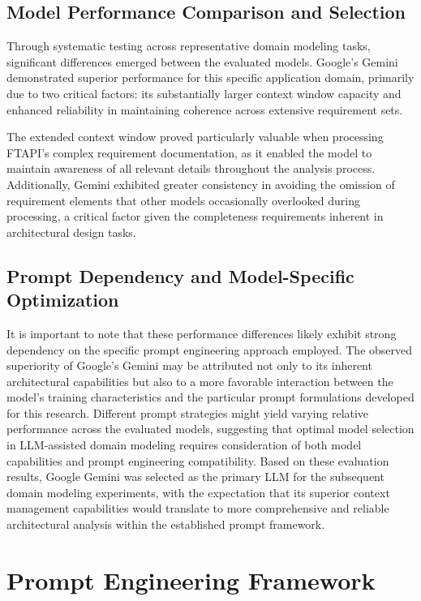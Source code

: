 \subsection{Model Performance Comparison and Selection}
Through systematic testing across representative domain modeling tasks, significant differences emerged between the evaluated models. Google's Gemini demonstrated superior performance for this specific application domain, primarily due to two critical factors: its substantially larger context window capacity and enhanced reliability in maintaining coherence across extensive requirement sets.

The extended context window proved particularly valuable when processing FTAPI's complex requirement documentation, as it enabled the model to maintain awareness of all relevant details throughout the analysis process. Additionally, Gemini exhibited greater consistency in avoiding the omission of requirement elements that other models occasionally overlooked during processing, a critical factor given the completeness requirements inherent in architectural design tasks.

\subsection{Prompt Dependency and Model-Specific Optimization}
It is important to note that these performance differences likely exhibit strong dependency on the specific prompt engineering approach employed. The observed superiority of Google's Gemini may be attributed not only to its inherent architectural capabilities but also to a more favorable interaction between the model's training characteristics and the particular prompt formulations developed for this research. Different prompt strategies might yield varying relative performance across the evaluated models, suggesting that optimal model selection in LLM-assisted domain modeling requires consideration of both model capabilities and prompt engineering compatibility.
Based on these evaluation results, Google Gemini was selected as the primary LLM for the subsequent domain modeling experiments, with the expectation that its superior context management capabilities would translate to more comprehensive and reliable architectural analysis within the established prompt framework.

\section{Prompt Engineering Framework}

